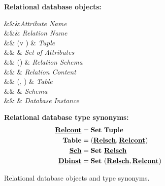 \begin{figure}

\textbf{Relational database objects:}
\begin{syntax}
\synDef \vAtt \attnametype &&&\textit{Attribute Name}\\
\synDef \vRel \relnametype &&& \textit{Relation Name}\\
\synDef {\underline{\vTuple}} { \tupletype} &\eqq& {(\vi v \numAtts)} & \textit{Tuple}\\
\synDef {\underline{\vAttList}} {\settype \attnametype} &\eqq& 
 & \textit{Set of Attributes}\\
\synDef \pRelSch \pRelSchSet &\eqq& \vRel\left(\underline{\vAttList}\right) & \textit{Relation Schema}\\
\synDef \pRelCont \pRelContSet &\eqq&  & \textit{Relation Content}\\
\synDef \pTab \pTabSet &\eqq& \left(\pRelSch, \pRelCont\right) & \textit{Table}\\
\synDef \pSch \pSchSet  &\eqq& \vSchDef & \textit{Schema}\\
\synDef \pInst \pInstSet &\eqq&  & \textit{Database Instance}\\
\end{syntax}

\medskip
\textbf{Relational database type synonyms:}
\begin{alignat*}{1}
\pRelContSet &= {\settype \tupletype}\\
\pTabSet &= \typepair{\pRelSchSet, \pRelContSet}\\
\pSchSet &= \settype {\underline \relschtype}\\
{\underline \dbinsttype} &= \settype {(\pRelSchSet, {\underline \relconttype})}
\end{alignat*}
\caption{Relational database objects and type synonyms.}
\label{fig:rdb-def}
\end{figure} 
